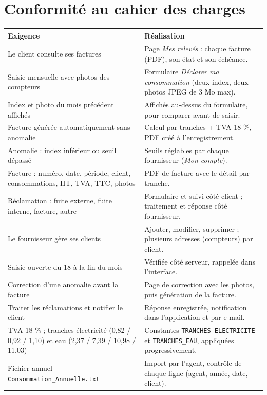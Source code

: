 \documentclass[11pt,a4paper]{article}
\begin{document}
\section{Conformité au cahier des charges}
\begin{center}\small
\begin{tabularx}{\linewidth}{>{\raggedright\arraybackslash}p{6.2cm}X}
\toprule
\textbf{Exigence} & \textbf{Réalisation} \\
\midrule
Le client consulte ses factures & Page \textit{Mes relevés} : chaque facture (PDF), son état et son échéance. \\
Saisie mensuelle avec photos des compteurs & Formulaire \textit{Déclarer ma consommation} (deux index, deux photos JPEG de 3 Mo max). \\
Index et photo du mois précédent affichés & Affichés au-dessus du formulaire, pour comparer avant de saisir. \\
Facture générée automatiquement sans anomalie & Calcul par tranches + TVA 18 \%, PDF créé à l'enregistrement. \\
Anomalie : index inférieur ou seuil dépassé & Seuils réglables par chaque fournisseur (\textit{Mon compte}). \\
Facture : numéro, date, période, client, consommations, HT, TVA, TTC, photos & PDF de facture avec le détail par tranche. \\
Réclamation : fuite externe, fuite interne, facture, autre & Formulaire et suivi côté client ; traitement et réponse côté fournisseur. \\
Le fournisseur gère ses clients & Ajouter, modifier, supprimer ; plusieurs adresses (compteurs) par client. \\
Saisie ouverte du 18 à la fin du mois & Vérifiée côté serveur, rappelée dans l'interface. \\
Correction d'une anomalie avant la facture & Page de correction avec les photos, puis génération de la facture. \\
Traiter les réclamations et notifier le client & Réponse enregistrée, notification dans l'application et par e-mail. \\
TVA 18 \% ; tranches électricité (0,82 / 0,92 / 1,10) et eau (2,37 / 7,39 / 10,98 / 11,03) & Constantes \texttt{TRANCHES\_ELECTRICITE} et \texttt{TRANCHES\_EAU}, appliquées progressivement. \\
Fichier annuel \texttt{Consommation\_Annuelle.txt} & Import par l'agent, contrôle de chaque ligne (agent, année, date, client). \\

\end{tabularx}
\end{center}
\end{document}
